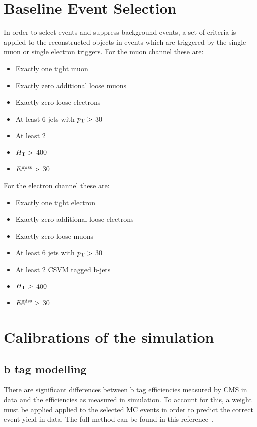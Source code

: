 \section{Baseline Event Selection}
\label{sec:baseline}
In order to select \tttt events and suppress background events, a set of criteria is applied to the reconstructed objects in events which are triggered by the single muon or single electron triggers.
For the muon channel these are:
\begin{itemize}
\setlength\itemsep{0em}
\item Exactly one tight muon
\item Exactly zero additional loose muons
\item Exactly zero loose electrons
\item At least 6 jets with $p_{\mathrm{T}} >$ 30 \GeV
\item At least 2 
\item $H_{\mathrm{T}} > $ 400 \GeV 
\item $E_{\mathrm{T}}^{\text{miss}} > $ 30 \GeV 
\end{itemize}
For the electron channel these are:
\begin{itemize}
\itemsep0em 
\item Exactly one tight electron
\item Exactly zero additional loose electrons
\item Exactly zero loose muons
\item At least 6 jets with $p_{\mathrm{T}} >$ 30 \GeV
\item At least 2 CSVM tagged b-jets
\item $H_{\mathrm{T}} > $ 400 \GeV 
\item $E_{\mathrm{T}}^{\text{miss}} > $ 30 \GeV 
\end{itemize}

\section{Calibrations of the simulation}
\label{sec:Calibrations}
\subsection{b tag modelling}

There are significant differences between b tag efficiencies measured by CMS in data and the efficiencies as measured in simulation. To account for this, a weight must be applied applied to the selected MC events in order to predict the correct event yield in data. The full method can be found in this reference~\cite{CMS-PAS-BTV-13-001}.

